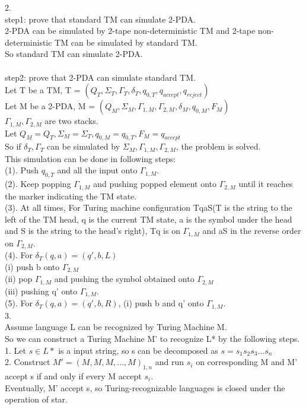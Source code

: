 \documentclass[a4paper]{article}
\begin{document}
2.\\
step1: prove that standard TM can simulate 2-PDA.\\
2-PDA can be simulated by 2-tape non-deterministic TM and 2-tape non-deterministic TM can be simulated by standard TM.\\
So standard TM can simulate 2-PDA.\\
\\
step2: prove that 2-PDA can simulate standard TM.\\
Let T be a TM, T = $(Q_T, \Sigma_T, \Gamma_T, \delta_T, q_{0,T}, q_{accept}, q_{reject})$\\
Let M be a 2-PDA, M = $(Q_M, \Sigma_M, \Gamma_{1, M}, \Gamma_{2, M}, \delta_M, q_{0, M}, F_M)$\\
$\Gamma_{1, M}, \Gamma_{2, M}$ are two stacks.\\
Let $Q_M=Q_T, \Sigma_M = \Sigma_T, q_{0, M}=q_{0, T}, F_M=q_{accept}$\\
So if $\delta_T, \Gamma_T$ can be simulated by $\Sigma_M, \Gamma_{1, M}, \Gamma_{2, M}$, the problem is solved.\\
This simulation can be done in following steps:\\
(1). Push $q_{0,T}$ and all the input onto $\Gamma_{1, M}$.\\
(2). Keep popping $\Gamma_{1, M}$ and pushing popped element onto $\Gamma_{2, M}$ until it reaches the marker indicating the TM state.\\
(3). At all times, For Turing machine configuration TqaS(T is the string to the left of the TM head, q is the current TM state, a  is the symbol under the head and S is the string to the head’s right), Tq is on $\Gamma_{1, M}$ and aS in the reverse order on $\Gamma_{2, M}$.\\
(4). For $\delta_T(q,a) = (q', b, L)$\\
	(i) push b onto $\Gamma_{2, M}$\\
    (ii) pop $\Gamma_{1, M}$ and pushing the symbol obtained onto $\Gamma_{2, M}$\\
    (iii) pushing q' onto $\Gamma_{1, M}$.\\
(5). For $\delta_T(q,a) = (q', b, R)$, (i) push b and q' onto $\Gamma_{1, M}$.\\


3.\\
Assume language L can be recognized by Turing Machine M. \\
So we can construct a Turing Machine M' to recognize L* by the following steps.\\
1. Let $s\in L*$ is a input string, so s can be decomposed as $s=s_1 s_2 s_3... s_n$\\
2. Construct $M'=(M, M, M, ..., M)_{1,n}$ and run $s_i$ on corresponding M and M' accept s if and only if every M accept $s_i$.\\
Eventually, M' accept s, so Turing-recognizable languages is closed under the operation of star.\\
\end{document}

